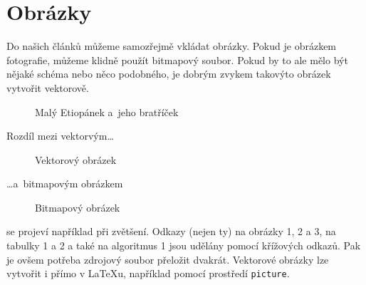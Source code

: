 \documentclass[a4 paper,11pt]{article}
\begin{document}
\section{Obrázky}

Do našich článků můžeme samozřejmě vkládat obrázky. Pokud je obrázkem fotografie,
můžeme klidně použít bitmapový soubor. Pokud by to ale mělo být nějaké schéma nebo
něco podobného, je dobrým zvykem takovýto obrázek vytvořit vektorově.


\begin{figure}[h]
		\centering
		\caption{Malý Etiopánek a~jeho bratříček}
		\label{figure:etiopan}
	\end{figure}





\newpage

Rozdíl mezi vektorvým\ldots

\begin{figure}[h]
		\centering
		\caption{Vektorový obrázek}
		\label{figure:vektorovy}
	\end{figure}
	\bigskip

\ldots a~bitmapovým obrázkem

\begin{figure}[h]
		\centering
		\caption{Bitmapový obrázek}
		\label{figure:rastrovy}
	\end{figure}
	\bigskip

se projeví například při zvětšení.
Odkazy (nejen ty) na obrázky 1, 2 a 3, na  
tabulky 1 a 2 a také na algoritmus 1 jsou udělány pomocí 
křížových odkazů. Pak je ovšem potřeba zdrojový soubor přeložit dvakrát.
Vektorové obrázky lze vytvořit i přímo v \LaTeX u, například pomocí prostředí 
\texttt{picture}.
	

    
\end{document}
